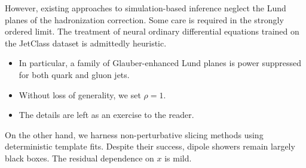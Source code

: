However, existing approaches to simulation-based inference neglect the
Lund planes of the hadronization correction. Some care is required in
the strongly ordered limit. The treatment of neural ordinary
differential equations trained on the JetClass dataset is admittedly
heuristic.

\begin{itemize}
  \item In particular, a family of Glauber-enhanced Lund planes is power suppressed for both quark and gluon jets.
  \item Without loss of generality, we set $\rho = 1$.
  \item The details are left as an exercise to the reader.
\end{itemize}

On the other hand, we harness non-perturbative slicing methods using
deterministic template fits. Despite their success, dipole showers
remain largely black boxes. The residual dependence on $x$ is mild.

